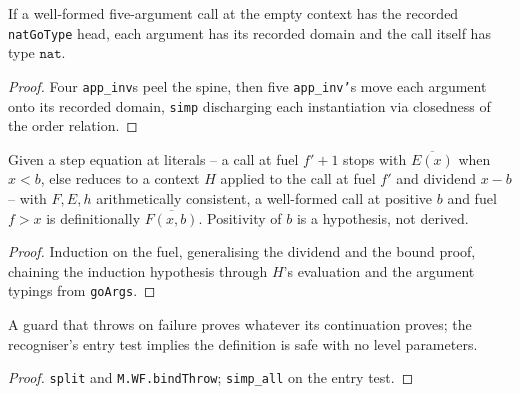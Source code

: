 \begin{lemma}
\label{vpc:thm:goargs}\leanok
{}

 If a well-formed five-argument call at the empty context has the recorded
\texttt{natGoType} head, each argument has its recorded domain and the call itself has type
$\mathtt{nat}$.
\end{lemma}
\begin{proof}\leanok
{}
 Four \texttt{app\_inv}s peel the spine, then five \texttt{app\_inv'}s move each
argument onto its recorded domain, \texttt{simp} discharging each instantiation via closedness of
the order relation.
\end{proof}

\begin{theorem}
\label{vpc:thm:natfuelrec}\leanok
{}

 Given a step equation at literals -- a call at fuel $f'+1$ stops with
$\overline{E(x)}$ when $x < b$, else reduces to a context $H$ applied to the call at fuel $f'$ and
dividend $x - b$ -- with $F,E,h$ arithmetically consistent, a well-formed call at positive $b$ and
fuel $f > x$ is definitionally $\overline{F(x,b)}$.
Positivity of $b$ is a hypothesis, not derived.
\end{theorem}
\begin{proof}\leanok
{}
 Induction on the fuel, generalising the dividend and the bound proof, chaining the
induction hypothesis through $H$'s evaluation and the argument typings from \texttt{goArgs}.
\end{proof}

\begin{lemma}
\label{vpc:lem:elsefail-hok}
\leanok
{}

 A guard that throws on failure proves whatever its continuation proves; the
recogniser's entry test implies the definition is safe with no level parameters.
\end{lemma}
\begin{proof}\leanok
{}
 \texttt{split} and \texttt{M.WF.bindThrow}; \texttt{simp\_all} on the entry test.
\end{proof}

